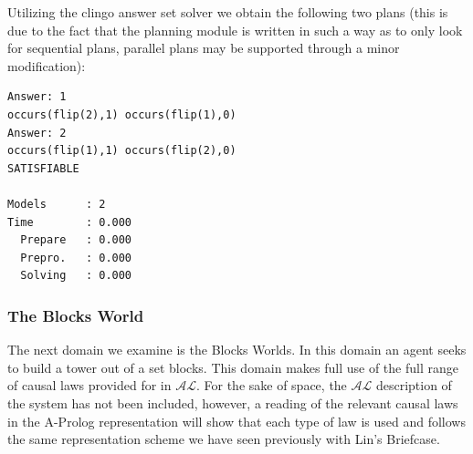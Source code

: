 \documentclass{article}
\newcommand{\AL}{\ensuremath{\mathcal{AL}}}
\begin{document}
\noindent Utilizing the clingo answer set solver we obtain the following two plans (this is due to the fact that the planning module is written in such a way as to only look for sequential plans, parallel plans may be supported through a minor modification):
\begin{verbatim}
Answer: 1
occurs(flip(2),1) occurs(flip(1),0) 
Answer: 2
occurs(flip(1),1) occurs(flip(2),0) 
SATISFIABLE

Models      : 2     
Time        : 0.000
  Prepare   : 0.000
  Prepro.   : 0.000
  Solving   : 0.000
\end{verbatim}

\subsubsection{The Blocks World}

The next domain we examine is the Blocks Worlds. In this domain an agent seeks to build a tower out of a set blocks. This domain makes full use of the full range of causal laws provided for in $\AL$. For the sake of space, the $\AL$ description of the system has not been included, however, a reading of the relevant causal laws in the A-Prolog representation will show that each type of law is used and follows the same representation scheme we have seen previously with Lin's Briefcase.
\end{document}
